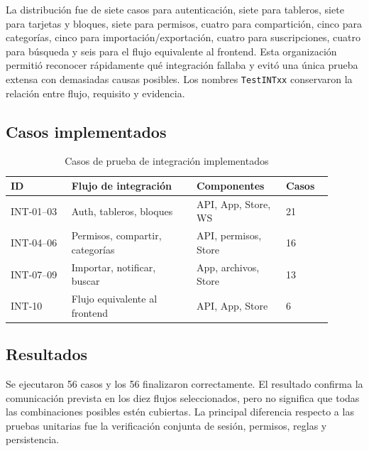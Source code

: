 \documentclass[conference]{IEEEtran}
\begin{document}
La distribución fue de siete casos para autenticación, siete para tableros, siete para tarjetas y bloques, siete para permisos, cuatro para compartición, cinco para categorías, cinco para importación/exportación, cuatro para suscripciones, cuatro para búsqueda y seis para el flujo equivalente al frontend. Esta organización permitió reconocer rápidamente qué integración fallaba y evitó una única prueba extensa con demasiadas causas posibles. Los nombres \texttt{TestINTxx} conservaron la relación entre flujo, requisito y evidencia.
\vspace{\baselineskip}

\subsection{Casos implementados}

\begin{table}[htbp]
\caption{Casos de prueba de integración implementados}
\label{tab:casos_integracion}
\centering
\begin{tabular}{|p{0.17\linewidth}|p{0.35\linewidth}|p{0.25\linewidth}|p{0.13\linewidth}|}
\hline
\textbf{ID} & \textbf{Flujo de integración} & \textbf{Componentes} & \textbf{Casos} \\
\hline
INT-01--03 & Auth, tableros, bloques & API, App, Store, WS & 21 \\
\hline
INT-04--06 & Permisos, compartir, categorías & API, permisos, Store & 16 \\
\hline
INT-07--09 & Importar, notificar, buscar & App, archivos, Store & 13 \\
\hline
INT-10 & Flujo equivalente al frontend & API, App, Store & 6 \\
\hline
\end{tabular}
\end{table}
\vspace{\baselineskip}

\subsection{Resultados}
Se ejecutaron 56 casos y los 56 finalizaron correctamente. El resultado confirma la comunicación prevista en los diez flujos seleccionados, pero no significa que todas las combinaciones posibles estén cubiertas. La principal diferencia respecto a las pruebas unitarias fue la verificación conjunta de sesión, permisos, reglas y persistencia.
\end{document}
